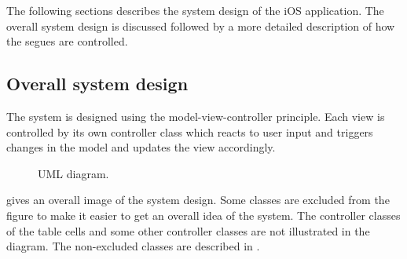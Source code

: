 The following sections describes the system design of the iOS application. The overall system design is discussed followed by a more detailed description of how the segues are controlled.

\subsection{Overall system design}
The  system is designed using the model-view-controller principle. Each view is controlled by its own controller class which reacts to user input and triggers changes in the model and updates the view accordingly.
\begin{figure}[ht]
\caption{\footnotesize UML diagram.}
\label{fig:ios_UML}
\end{figure}
\FloatBarrier

 gives an overall image of the system design. Some classes are excluded from the figure to make it easier to get an overall idea of the system. The controller classes of the table cells and some other controller classes are not illustrated in the diagram. The non-excluded classes are described in .


